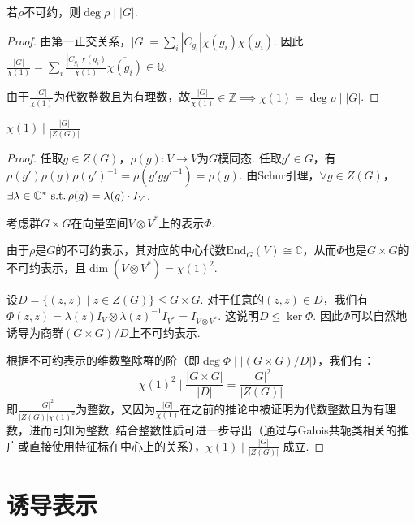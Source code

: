 \begin{corollary}[次数整除群阶]
    若$\rho$不可约，则$\deg \rho \mid |G|$.
\end{corollary}

\begin{proof}
    由第一正交关系，$|G| = \sum_{i} |C_{g_i}| \chi(g_i) \overline{\chi(g_i)}$.
    因此 $\frac{|G|}{\chi(1)} = \sum_{i} \frac{|C_{g_i}| \chi(g_i)}{\chi(1)} \overline{\chi(g_i)} \in \mathbb{Q}$.
    
    由于$\frac{|G|}{\chi(1)}$为代数整数且为有理数，故$\frac{|G|}{\chi(1)} \in \mathbb{Z} \implies \chi(1) = \deg \rho \mid |G|$.
\end{proof}

\begin{theorem}[]
    $\chi(1) \mid \frac{|G|}{|Z(G)|}$
\end{theorem}

\begin{proof}
    任取$g \in Z(G)$，$\rho(g): V \to V$为$G$模同态.
    任取$g' \in G$，有$\rho(g') \rho(g) \rho(g')^{-1} = \rho(g' g g'^{-1}) = \rho(g)$.
    由Schur引理，$\forall g \in Z(G)$，$\exists \lambda \in \mathbb{C}^* \operatorname{\,\text{s.t.}} \rho(g) = \lambda(g) \cdot I_V$.\par
    考虑群$G \times G$在向量空间$V \otimes V^*$上的表示$\Phi$.\par
    由于$\rho$是$G$的不可约表示，其对应的中心代数$\mathrm{End}_G(V) \cong \mathbb{C}$，从而$\Phi$也是$G \times G$的不可约表示，且$\dim(V \otimes V^*) = \chi(1)^2$.
    
    设$D = \{(z, z) \mid z \in Z(G)\} \leqslant G \times G$.
    对于任意的$(z, z) \in D$，我们有$\Phi(z, z) = \lambda(z) I_V \otimes \lambda(z)^{-1} I_{V^*} = I_{V \otimes V^*}$.
    这说明$D \leqslant \ker \Phi$.
    因此$\Phi$可以自然地诱导为商群$(G \times G)/D$上不可约表示.
    
    根据不可约表示的维数整除群的阶（即$\deg \Phi \mid |(G \times G)/D|$），我们有：
    \[ \chi(1)^2 \mid \frac{|G \times G|}{|D|} = \frac{|G|^2}{|Z(G)|} \]
    即$\frac{|G|^2}{|Z(G)|\chi(1)^2}$为整数，又因为$\frac{|G|}{\chi(1)}$在之前的推论中被证明为代数整数且为有理数，进而可知为整数.
    结合整数性质可进一步导出（通过与Galois共轭类相关的推广或直接使用特征标在中心上的关系），$\chi(1) \mid \frac{|G|}{|Z(G)|}$ 成立.
\end{proof}

\section{诱导表示}


